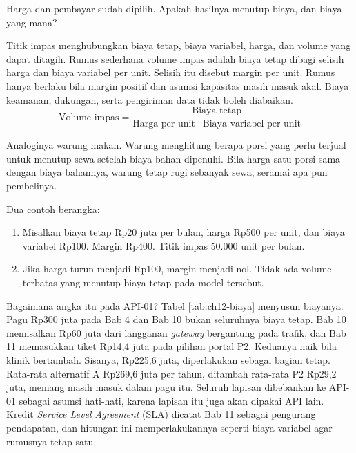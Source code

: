 Harga dan pembayar sudah dipilih. Apakah hasilnya menutup biaya, dan biaya yang mana?

Titik impas menghubungkan biaya tetap, biaya variabel, harga, dan volume yang dapat ditagih. Rumus sederhana volume impas adalah biaya
tetap dibagi selisih harga dan biaya variabel per unit. Selisih itu disebut margin per unit. Rumus hanya berlaku bila margin positif
dan asumsi kapasitas masih masuk akal. Biaya keamanan, dukungan, serta pengiriman data tidak boleh diabaikan.
\begin{equation*}
  \text{Volume impas} = \frac{\text{Biaya tetap}}{\text{Harga per unit} - \text{Biaya variabel per unit}}
\end{equation*}

Analoginya warung makan. Warung menghitung berapa porsi yang perlu terjual untuk menutup sewa setelah biaya bahan dipenuhi. Bila
harga satu porsi sama dengan biaya bahannya, warung tetap rugi sebanyak sewa, seramai apa pun pembelinya.

Dua contoh berangka:
\begin{enumerate}
  \item Misalkan biaya tetap Rp20 juta per bulan, harga Rp500 per unit, dan biaya variabel Rp100. Margin Rp400. Titik impas 50.000
        unit per bulan.
  \item Jika harga turun menjadi Rp100, margin menjadi nol. Tidak ada volume terbatas yang menutup biaya tetap pada model tersebut.
\end{enumerate}

Bagaimana angka itu pada API-01? Tabel \ref{tab:ch12-biaya} menyusun biayanya. Pagu Rp300 juta pada Bab 4 dan Bab 10 bukan seluruhnya
biaya tetap. Bab 10 memisalkan Rp60 juta dari langganan \textit{gateway} bergantung pada trafik, dan Bab 11 memasukkan tiket Rp14,4
juta pada pilihan portal P2. Keduanya naik bila klinik bertambah. Sisanya, Rp225,6 juta, diperlakukan sebagai bagian tetap. Rata-rata
alternatif A Rp269,6 juta per tahun, ditambah rata-rata P2 Rp29,2 juta, memang masih masuk dalam pagu itu. Seluruh lapisan dibebankan ke
API-01 sebagai asumsi hati-hati, karena lapisan itu juga akan dipakai API lain. Kredit \textit{Service Level Agreement} (SLA) dicatat Bab
11 sebagai pengurang pendapatan, dan hitungan ini memperlakukannya seperti biaya variabel agar rumusnya tetap satu.

